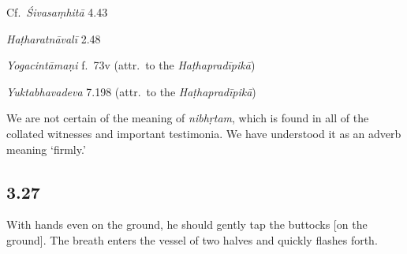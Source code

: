 \begin{ekdosis}
\begin{sources}[hp03_026]
Cf.~\emph{Śivasaṃhitā}  4.43
\begin{versinnote}
\end{versinnote}
\end{sources}

\begin{testimonia}[hp03_026]
\emph{Haṭharatnāvalī} 2.48
\begin{versinnote}
\tl{\var{ekadhīḥ ] ekadhā \vl}\\!}
\end{versinnote}

\emph{Yogacintāmaṇi} f.~73v (attr.~to the \emph{Haṭhapradīpikā})
\begin{versinnote}
\end{versinnote}

\emph{Yuktabhavadeva} 7.198 (attr.~to the \emph{Haṭhapradīpikā})
\begin{versinnote}
\end{versinnote}
\end{testimonia}

\begin{philcomm}[hp03_026]
We are not certain of the meaning of \emph{nibhṛtam}, which is found in all of the collated witnesses and important testimonia. We have understood it as an adverb meaning `firmly.'
\end{philcomm}

\subsection*{3.27}
\begin{translation}[hp03_027]
With hands even on the ground, he should gently tap the buttocks [on the ground]. The breath enters the vessel of two halves and quickly flashes forth.
\end{translation}


\end{ekdosis}

